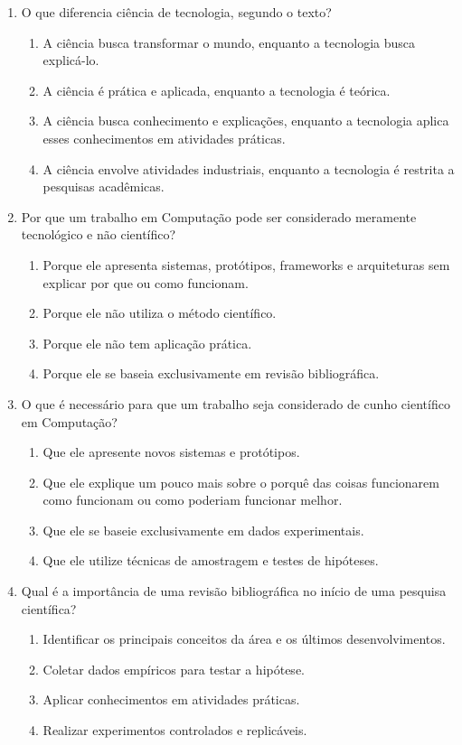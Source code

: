 \documentclass[a4paper,12pt]{article}
\begin{document}
\begin{enumerate}
\item O que diferencia ciência de tecnologia, segundo o texto?
    \begin{enumerate}[label=(\alph*)]
        \item A ciência busca transformar o mundo, enquanto a tecnologia busca explicá-lo.
        \item A ciência é prática e aplicada, enquanto a tecnologia é teórica.
        \item A ciência busca conhecimento e explicações, enquanto a tecnologia aplica esses conhecimentos em atividades práticas.
        \item A ciência envolve atividades industriais, enquanto a tecnologia é restrita a pesquisas acadêmicas.
    \end{enumerate}

\item Por que um trabalho em Computação pode ser considerado meramente tecnológico e não científico?
    \begin{enumerate}[label=(\alph*)]
        \item Porque ele apresenta sistemas, protótipos, frameworks e arquiteturas sem explicar por que ou como funcionam.
        \item Porque ele não utiliza o método científico.
        \item Porque ele não tem aplicação prática.
        \item Porque ele se baseia exclusivamente em revisão bibliográfica.
    \end{enumerate}

\item O que é necessário para que um trabalho seja considerado de cunho científico em Computação?
    \begin{enumerate}[label=(\alph*)]
        \item Que ele apresente novos sistemas e protótipos.
        \item Que ele explique um pouco mais sobre o porquê das coisas funcionarem como funcionam ou como poderiam funcionar melhor.
        \item Que ele se baseie exclusivamente em dados experimentais.
        \item Que ele utilize técnicas de amostragem e testes de hipóteses.
    \end{enumerate}

\item Qual é a importância de uma revisão bibliográfica no início de uma pesquisa científica?
    \begin{enumerate}[label=(\alph*)]
        \item Identificar os principais conceitos da área e os últimos desenvolvimentos.
        \item Coletar dados empíricos para testar a hipótese.
        \item Aplicar conhecimentos em atividades práticas.
        \item Realizar experimentos controlados e replicáveis.
    \end{enumerate}

\end{enumerate}

\newpage
\end{document}
